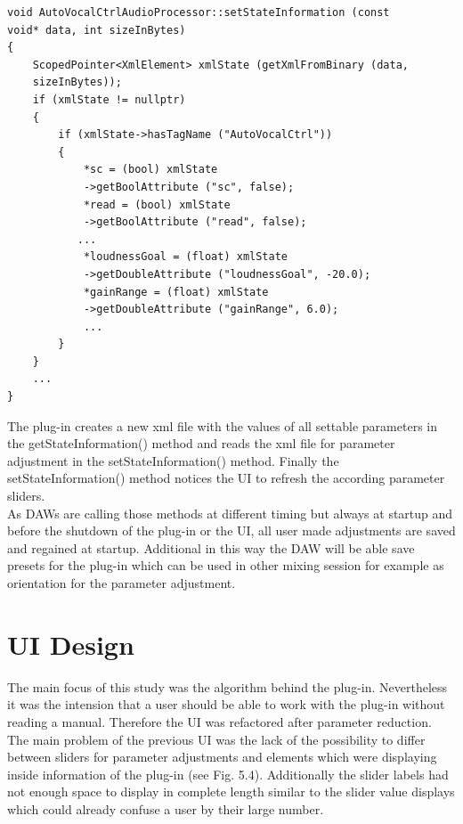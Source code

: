 \begin{lstlisting}[frame=single]
void AutoVocalCtrlAudioProcessor::setStateInformation (const 
void* data, int sizeInBytes)
{
    ScopedPointer<XmlElement> xmlState (getXmlFromBinary (data, 
    sizeInBytes));
    if (xmlState != nullptr)
    {
        if (xmlState->hasTagName ("AutoVocalCtrl"))
        {
            *sc = (bool) xmlState
            ->getBoolAttribute ("sc", false);
            *read = (bool) xmlState
            ->getBoolAttribute ("read", false);
           ...
            *loudnessGoal = (float) xmlState
            ->getDoubleAttribute ("loudnessGoal", -20.0);
            *gainRange = (float) xmlState
            ->getDoubleAttribute ("gainRange", 6.0);
            ...
        }
    }
    ...
}
\end{lstlisting}

The plug-in creates a new xml file with the values of all settable parameters in the getStateInformation() method and reads the xml file for parameter adjustment in the setStateInformation() method. Finally the setStateInformation() method notices the UI to refresh the according parameter sliders.\\
As DAWs are calling those methods at different timing but always at startup and before the shutdown of the plug-in or the UI, all user made adjustments are saved and regained at startup. Additional in this way the DAW will be able save presets for the plug-in which can be used in other mixing session for example as orientation for the parameter adjustment.\\

\section{UI Design}

The main focus of this study was the algorithm behind the plug-in. Nevertheless it was the intension that a user should be able to work with the plug-in without reading a manual. Therefore the UI was refactored after parameter reduction.\\
The main problem of the previous UI was the lack of the possibility to differ between sliders for parameter adjustments and elements which were displaying inside information of the plug-in (see Fig. 5.4). Additionally the slider labels had not enough space to display in complete length similar to the slider value displays which could already confuse a user by their large number.\\

